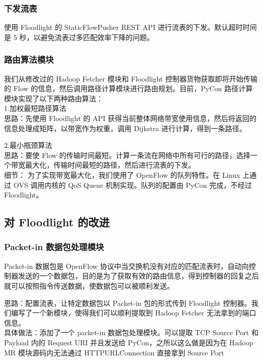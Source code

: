 \documentclass[a4paper, 11pt]{article}                                                   %
\begin{document}
\begin{CJK*}{UTF8}{song}
\subsubsection{下发流表}
使用 Floodlight 的 StaticFlowPusher REST API 进行流表的下发。默认超时时间是 5 秒，以避免流表过多匹配效率下降的问题。

\subsubsection{路由算法模块}
我们从修改过的 Hadoop Fetcher 模块和 Floodlight 控制器货物获取即将开始传输的 Flow 的信息，然后调用路径计算模块进行路由规划。目前，PyCon 路径计算模块实现了以下两种路由算法：\\

1.加权最短路径算法\\
思路：先使用 Floodlight 的 API 获得当前整体网络带宽使用信息，然后将返回的信息处理成矩阵，以带宽作为权重，调用 Dijkstra 进行计算，得到一条路径。\\
\bigskip

2.最小瓶颈算法\\
思路：要使 Flow 的传输时间最短。计算一条流在网络中所有可行的路径，选择一个带宽最大化，传输时间最短的路径，然后进行流表的下发。\\

细节：
为了实现带宽最大化，我们使用了 OpenFlow 的队列特性。在 Linux 上通过 OVS 调用内核的 QoS Queue 机制实现。队列的配置由 PyCon 完成，不经过 Floodlight。

\subsection{对 Floodlight 的改进}

\subsubsection{Packet-in 数据包处理模块}

Packet-in 数据包是 OpenFlow 协议中当交换机没有对应的匹配流表时，自动向控制器发送的一个数据包，目的是为了获取有效的路由信息，得到控制器的回复之后就可以按照指令传送数据，使数据包可以被顺利发送。

思路：配置流表，让特定数据包以 Packet-in 包的形式传到 Floodlight 控制器。我们编写了一个新模块，使得我们可以顺利提取到 Hadoop Fetcher 无法拿到的端口信息。\\

具体做法：添加了一个 packet-in 数据包处理模块。可以提取 TCP Source Port 和 Payload 内的 Request URI 并且发送给 PyCon，之所以这么做是因为在 Hadoop MR 模块源码内无法通过 HTTPURLConnection 直接拿到 Source Port\\


\end{CJK*}
\end{document}
